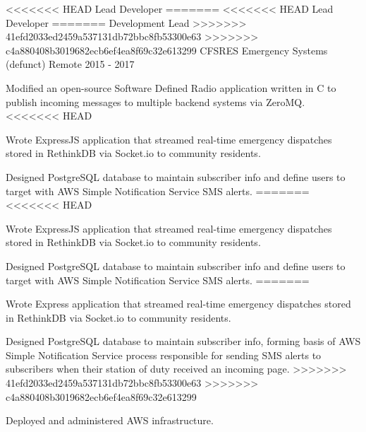 \begin{cventries}
  \cventry
<<<<<<< HEAD
    {Lead Developer} %
=======
<<<<<<< HEAD
    {Lead Developer} %
=======
    {Development Lead} %
>>>>>>> 41efd2033ed2459a537131db72bbc8fb53300e63
>>>>>>> c4a880408b3019682ecb6ef4ea8f69c32e613299
    {CFSRES Emergency Systems (defunct)} %
    {Remote} %
    {2015 - 2017} %
    {
      \begin{cvitems} %
        \item {Modified an open-source Software Defined Radio application written in C to publish incoming messages to multiple backend systems via ZeroMQ.}
<<<<<<< HEAD
        \item {Wrote ExpressJS application that streamed real-time emergency dispatches stored in RethinkDB via Socket.io to community residents.}
        \item {Designed PostgreSQL database to maintain subscriber info and define users to target with AWS Simple Notification Service SMS alerts.}
=======
<<<<<<< HEAD
        \item {Wrote ExpressJS application that streamed real-time emergency dispatches stored in RethinkDB via Socket.io to community residents.}
        \item {Designed PostgreSQL database to maintain subscriber info and define users to target with AWS Simple Notification Service SMS alerts.}
=======
        \item {Wrote Express application that streamed real-time emergency dispatches stored in RethinkDB via Socket.io to community residents.}
        \item {Designed PostgreSQL database to maintain subscriber info, forming basis of AWS Simple Notification Service process responsible for sending SMS alerts to subscribers when their station of duty received an incoming page.}
>>>>>>> 41efd2033ed2459a537131db72bbc8fb53300e63
>>>>>>> c4a880408b3019682ecb6ef4ea8f69c32e613299
        \item {Deployed and administered AWS infrastructure.}
      \end{cvitems}
    }


\end{cventries}
